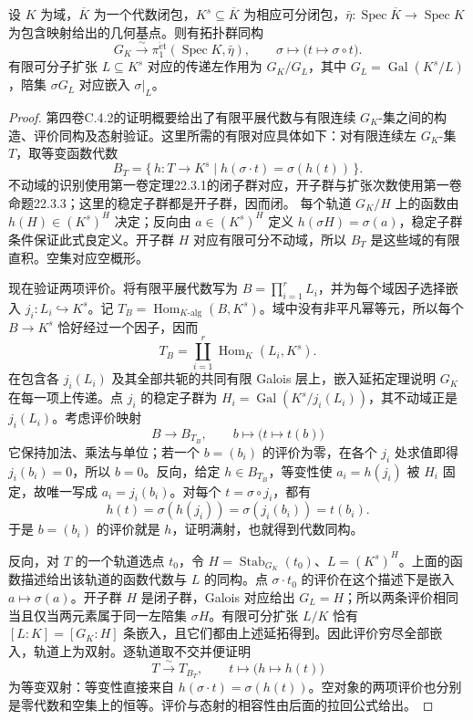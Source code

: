 \begin{proposition}\label{b3:prop:I-field-fundamental-group}
	设 \(K\) 为域，\(\overline K\) 为一个代数闭包，\(K^s\subseteq\overline K\) 为相应可分闭包，\(\bar\eta:\operatorname{Spec}\overline K\rightarrow\operatorname{Spec}K\) 为包含映射给出的几何基点。则有拓扑群同构
	\[
		G_K\xrightarrow{\sim}\pi_1^{\mathrm{\acute et}}(\operatorname{Spec}K,\bar\eta),
		\qquad\sigma\longmapsto\bigl(t\longmapsto\sigma\circ t\bigr).
	\]
	有限可分子扩张 \(L\subseteq K^s\) 对应的传递左作用为 \(G_K/G_L\)，其中 \(G_L=\operatorname{Gal}(K^s/L)\)，陪集 \(\sigma G_L\) 对应嵌入 \(\sigma|_L\)。
\end{proposition}
\begin{proof}
	第四卷C.4.2的证明概要给出了有限平展代数与有限连续 \(G_K\)-集之间的构造、评价同构及态射验证。这里所需的有限对应具体如下：对有限连续左 \(G_K\)-集 \(T\)，取等变函数代数
	\[
		B_T=\{\,h:T\rightarrow K^s\mid h(\sigma\cdot t)=\sigma(h(t))\,\}.
	\]
	不动域的识别使用第一卷定理22.3.1的闭子群对应，开子群与扩张次数使用第一卷命题22.3.3；这里的稳定子群都是开子群，因而闭。
	每个轨道 \(G_K/H\) 上的函数由 \(h(H)\in(K^s)^H\) 决定；反向由 \(a\in(K^s)^H\) 定义 \(h(\sigma H)=\sigma(a)\)，稳定子群条件保证此式良定义。开子群 \(H\) 对应有限可分不动域，所以 \(B_T\) 是这些域的有限直积。空集对应空概形。

	现在验证两项评价。将有限平展代数写为 \(B=\prod_{i=1}^rL_i\)，并为每个域因子选择嵌入 \(j_i:L_i\hookrightarrow K^s\)。记 \(T_B=\operatorname{Hom}_{K\text{-}\mathrm{alg}}(B,K^s)\)。域中没有非平凡幂等元，所以每个 \(B\rightarrow K^s\) 恰好经过一个因子，因而
	\[
		T_B=\coprod_{i=1}^r\operatorname{Hom}_K(L_i,K^s).
	\]
	在包含各 \(j_i(L_i)\) 及其全部共轭的共同有限 Galois 层上，嵌入延拓定理说明 \(G_K\) 在每一项上传递。点 \(j_i\) 的稳定子群为 \(H_i=\operatorname{Gal}(K^s/j_i(L_i))\)，其不动域正是 \(j_i(L_i)\)。考虑评价映射
	\[
		B\longrightarrow B_{T_B},\qquad b\longmapsto\bigl(t\longmapsto t(b)\bigr)
	\]
	它保持加法、乘法与单位；若一个 \(b=(b_i)\) 的评价为零，在各个 \(j_i\) 处求值即得 \(j_i(b_i)=0\)，所以 \(b=0\)。反向，给定 \(h\in B_{T_B}\)，等变性使 \(a_i=h(j_i)\) 被 \(H_i\) 固定，故唯一写成 \(a_i=j_i(b_i)\)。对每个 \(t=\sigma\circ j_i\)，都有
	\[
		h(t)=\sigma(h(j_i))=\sigma(j_i(b_i))=t(b_i).
	\]
	于是 \(b=(b_i)\) 的评价就是 \(h\)，证明满射，也就得到代数同构。

	反向，对 \(T\) 的一个轨道选点 \(t_0\)，令 \(H=\operatorname{Stab}_{G_K}(t_0)\)、\(L=(K^s)^H\)。上面的函数描述给出该轨道的函数代数与 \(L\) 的同构。点 \(\sigma\cdot t_0\) 的评价在这个描述下是嵌入 \(a\mapsto\sigma(a)\)。开子群 \(H\) 是闭子群，Galois 对应给出 \(G_L=H\)；所以两条评价相同当且仅当两元素属于同一左陪集 \(\sigma H\)。有限可分扩张 \(L/K\) 恰有 \([L:K]=[G_K:H]\) 条嵌入，且它们都由上述延拓得到。因此评价穷尽全部嵌入，轨道上为双射。逐轨道取不交并便证明
	\[
		T\xrightarrow{\sim}T_{B_T},\qquad
		t\longmapsto\bigl(h\longmapsto h(t)\bigr)
	\]
	为等变双射：等变性直接来自 \(h(\sigma\cdot t)=\sigma(h(t))\)。空对象的两项评价也分别是零代数和空集上的恒等。评价与态射的相容性由后面的拉回公式给出。


\end{proof}
